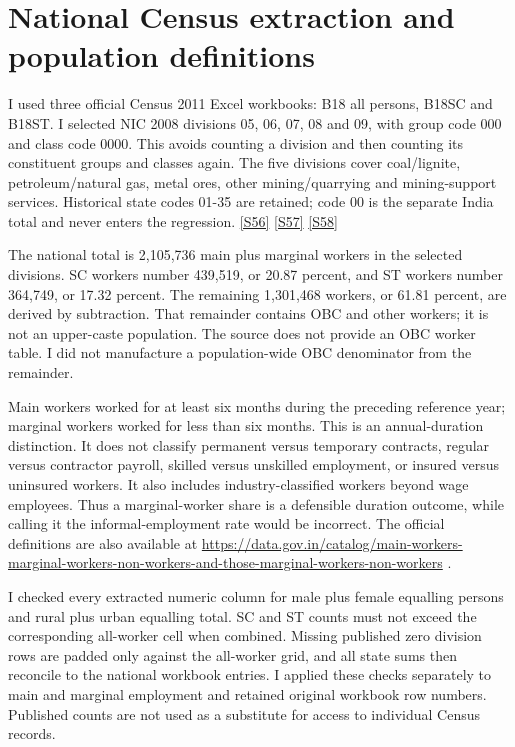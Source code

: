 \documentclass[11pt,a4paper]{report}
\begin{document}
\section{National Census extraction and population definitions}
I used three official Census 2011 Excel workbooks: B18 all persons, B18SC and B18ST. I selected NIC 2008 divisions 05, 06, 07, 08 and 09, with group code 000 and class code 0000. This avoids counting a division and then counting its constituent groups and classes again. The five divisions cover coal/\allowbreak{}lignite, petroleum/\allowbreak{}natural gas, metal ores, other mining/\allowbreak{}quarrying and mining-support services. Historical state codes 01-35 are retained; code 00 is the separate India total and never enters the regression. \hyperlink{S56}{[S56]} \hyperlink{S57}{[S57]} \hyperlink{S58}{[S58]}

The national total is 2,105,736 main plus marginal workers in the selected divisions. SC workers number 439,519, or 20.87 percent, and ST workers number 364,749, or 17.32 percent. The remaining 1,301,468 workers, or 61.81 percent, are derived by subtraction. That remainder contains OBC and other workers; it is not an upper-caste population. The source does not provide an OBC worker table. I did not manufacture a population-wide OBC denominator from the remainder.

Main workers worked for at least six months during the preceding reference year; marginal workers worked for less than six months. This is an annual-duration distinction. It does not classify permanent versus temporary contracts, regular versus contractor payroll, skilled versus unskilled employment, or insured versus uninsured workers. It also includes industry-classified workers beyond wage employees. Thus a marginal-worker share is a defensible duration outcome, while calling it the informal-employment rate would be incorrect. The official definitions are also available at \url{https://data.gov.in/catalog/main-workers-marginal-workers-non-workers-and-those-marginal-workers-non-workers} .

I checked every extracted numeric column for male plus female equalling persons and rural plus urban equalling total. SC and ST counts must not exceed the corresponding all-worker cell when combined. Missing published zero division rows are padded only against the all-worker grid, and all state sums then reconcile to the national workbook entries. I applied these checks separately to main and marginal employment and retained original workbook row numbers. Published counts are not used as a substitute for access to individual Census records.
\end{document}
